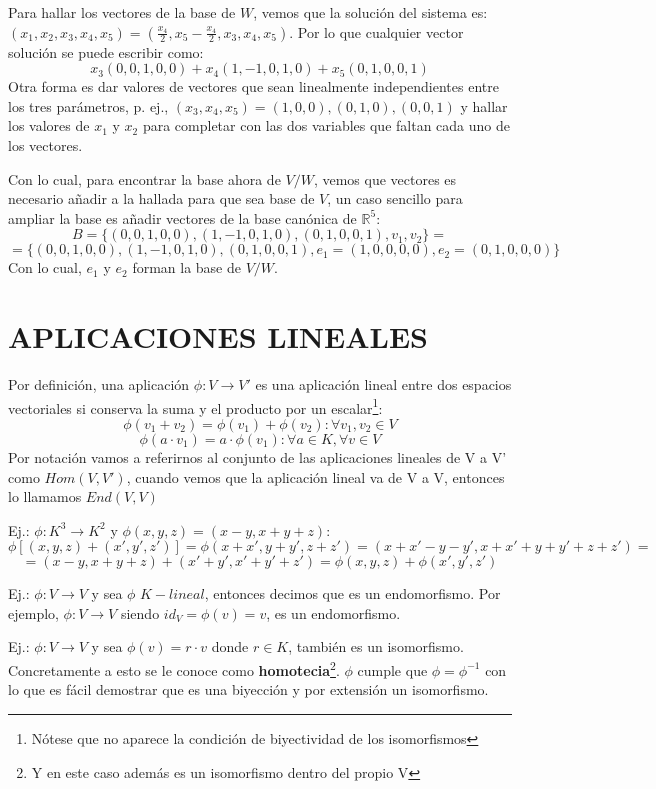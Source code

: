 \documentclass[10pt,a4paper,openright]{book}
\begin{document}
Para hallar los vectores de la base de $W$, vemos que la solución del sistema es: $(x_1,x_2,x_3,x_4,x_5)=(\frac{x_4}{2}, x_5-\frac{x_4}{2},x_3,x_4,x_5)$. Por lo que cualquier vector solución se puede escribir como:
$$x_3(0,0,1,0,0)+x_4(1,-1,0,1,0)+x_5(0,1,0,0,1)$$
Otra forma es dar valores de vectores que sean linealmente independientes entre los tres parámetros, p. ej., $(x_3,x_4,x_5)=(1,0,0),(0,1,0), (0,0,1)$ y hallar los valores de $x_1$ y $x_2$ para completar con las dos variables que faltan cada uno de los vectores.\par
Con lo cual, para encontrar la base ahora de $V/W$, vemos que  vectores es necesario añadir a la hallada para que sea base de $V$, un caso sencillo para ampliar la base es añadir vectores de la base canónica de $\mathbb R^5$:
$$B=\{(0,0,1,0,0),(1,-1,0,1,0),(0,1,0,0,1), v_1, v_2\}=$$
$$=\{(0,0,1,0,0),(1,-1,0,1,0),(0,1,0,0,1), e_1=(1,0,0,0,0), e_2=(0,1,0,0,0)\}$$
Con lo cual, $e_1$ y $e_2$ forman la base de $V/W$.

\section*{APLICACIONES LINEALES}
Por definición, una aplicación $\phi:V\longrightarrow V'$ es una aplicación lineal entre dos espacios vectoriales si conserva la suma y el producto por un escalar\footnote{Nótese que no aparece la condición de biyectividad de los isomorfismos}:
$$\phi(v_1+v_2)=\phi(v_1)+\phi(v_2): \forall v_1,v_2\in V$$
$$\phi(a\cdot v_1)=a\cdot \phi(v_1): \forall a\in K,\forall v\in V$$
Por notación vamos a referirnos al conjunto de las aplicaciones lineales de V a V' como $Hom(V,V')$, cuando vemos que la aplicación lineal va de V a V, entonces lo llamamos $End(V,V)$

Ej.: $\phi: K^3\longrightarrow K^2$ y $\phi(x,y,z)=(x-y, x+y+z)$:
$$\phi\left[(x,y,z)+(x',y',z')\right]=\phi(x+x',y+y',z+z')=(x+x'-y-y', x+x'+y+y'+z+z')=$$
$$=(x-y, x+y+z)+(x'+y',x'+y'+z')=\phi(x,y,z)+\phi(x',y',z')$$

Ej.: $\phi: V\longrightarrow V$ y sea $\phi$ $K-lineal$, entonces decimos que es un endomorfismo. Por ejemplo, $\phi: V\longrightarrow V$ siendo $id_V=\phi(v)=v$, es un endomorfismo.

Ej.: $\phi: V\longrightarrow V$ y sea $\phi(v)=r\cdot v$ donde $r\in K$, también es un isomorfismo. Concretamente a esto se le conoce como \textbf{homotecia}\footnote{Y en este caso además es un isomorfismo dentro del propio V}. $\phi$ cumple que $\phi=\phi^{-1}$ con lo que es fácil demostrar que es una biyección y por extensión un isomorfismo. 
\end{document}
